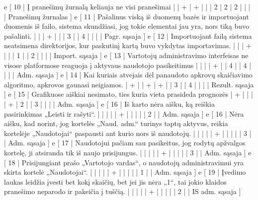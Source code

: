 {  e [ 10  | Į pranešimų žurnalą keliauja ne visi pranešimai     
                    |   | + | + |   |   | 2 | 2 | 2 |   |   |      | Pranešimų žurnalas ]
  e [ 11  | Pašalinus viską iš duomenų bazės ir importuojant duomenis iš failo,
  sistema skundžiasi, jog tokie elementai jau yra, nors tiką buvo pašalinti.     
                    |   |   | + |   |   | 3 |   | 4 |   |   |      | Pagr. sąsaja ]
  e [ 12  | Importuojant failą sistema neatsimena direktorijos, kur paskutinį
  kartą buvo vykdytas importavimas.   
                    |   |   | + |   |   | 1 |   | 2 |   |   |      | Import. sąsaja ]
  e [ 13  | Vartotojų administravimo interfeisas ne visose platformose reaguoja į
  aktyvaus naudotojo pasikeitimus  
                    |   |   |   | + |   | 4 |   | 4 |   |   |      | Adm. sąsaja ]
  e [ 14  | Kai kuriais atvejais dėl panaudoto apkrovų skaičiavimo algoritmo,
  apkrovos gaunasi neigiamos.
                    | + |   | + | + |   | 3 |   | 4 |   |   |      | Rezult. sąsaja ]
  e [ 15 | Grafikuose aiškiai nesimato, ties kuria vieta prasideda prognozės
                    | + |   |   |   | + | 2 |   | 3 |   |   |      | Adm. sąsaja ]
  e [ 16 | Iš karto nėra aišku, ką reiškia pasirinkimas „Leisti ir rašyti“.
                    |   |   |   |   | + |   |   |   |   | 2 |      | Adm. sąsaja ]
  e [ 16 | Nėra aišku, kad norint, jog kortelės „Naud. adm.“ turinys taptų aktyvus,
  reikia kortelėje „Naudotojai“ paspausti ant kurio nors iš naudotojų.
                    |   |   |   |   | + |   |   |   |   | 3 |      | Adm. sąsaja ]
  e [ 17 | Naudotojui pačiam sau pasikeitus, jog rodytų apžvalgos kortelę, ji
  atsiranda tik iš naujo prisijungus.
                    |   |   |   |   | + |   |   |   |   | 3 |      | Adm. sąsaja ]
  e [ 18 | Prisijungiant prašo „Vartotojo vardas“, o naudotojų administravimui
  yra skirta kortelė „Naudotojai“.
                    |   |   |   |   | + |   |   |   |   | 1 |      | Adm. sąsaja ]
  e [ 19 | Įvedimo laukas leidžia įvesti bet kokį skaičių, bet jei jis nėra
  „1“, tai jokio klaidos pranešimo neparodo ir pakeičia į tuščią.
                    |   |   |   |   | + |   |   |   |   | 2 |      | IS adm. sąsaja ]
}
